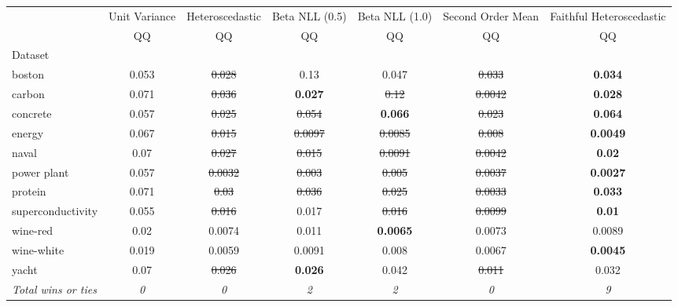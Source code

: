 \begin{tabular}{l|c|c|c|c|c|c}
\toprule
{} & {Unit Variance} & {Heteroscedastic} & {Beta NLL (0.5)} & {Beta NLL (1.0)} & {Second Order Mean} & {Faithful Heteroscedastic} \\
{} & {QQ} & {QQ} & {QQ} & {QQ} & {QQ} & {QQ} \\
{Dataset} & {} & {} & {} & {} & {} & {} \\
\midrule
boston & 0.053 & \sout{0.028} & 0.13 & 0.047 & \sout{0.033} & \textbf{0.034} \\
carbon & 0.071 & \sout{0.036} & \textbf{0.027} & \sout{0.12} & \sout{0.0042} & \textbf{0.028} \\
concrete & 0.057 & \sout{0.025} & \sout{0.054} & \textbf{0.066} & \sout{0.023} & \textbf{0.064} \\
energy & 0.067 & \sout{0.015} & \sout{0.0097} & \sout{0.0085} & \sout{0.008} & \textbf{0.0049} \\
naval & 0.07 & \sout{0.027} & \sout{0.015} & \sout{0.0091} & \sout{0.0042} & \textbf{0.02} \\
power plant & 0.057 & \sout{0.0032} & \sout{0.003} & \sout{0.005} & \sout{0.0037} & \textbf{0.0027} \\
protein & 0.071 & \sout{0.03} & \sout{0.036} & \sout{0.025} & \sout{0.0033} & \textbf{0.033} \\
superconductivity & 0.055 & \sout{0.016} & 0.017 & \sout{0.016} & \sout{0.0099} & \textbf{0.01} \\
wine-red & 0.02 & 0.0074 & 0.011 & \textbf{0.0065} & 0.0073 & 0.0089 \\
wine-white & 0.019 & 0.0059 & 0.0091 & 0.008 & 0.0067 & \textbf{0.0045} \\
yacht & 0.07 & \sout{0.026} & \textbf{0.026} & 0.042 & \sout{0.011} & 0.032 \\
\textit{{Total wins or ties}} & \textit{0} & \textit{0} & \textit{2} & \textit{2} & \textit{0} & \textit{9} \\
\bottomrule
\end{tabular}
